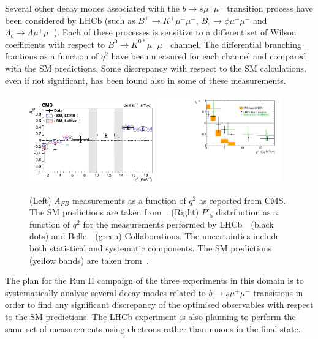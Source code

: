 Several other decay modes associated with the $b \to s \mu^+ \mu^-$ transition process have been considered by LHCb (such as $B^+ \to K^{+} \mu^+ \mu^-$, $B_s \to  \phi \mu^+ \mu^-$ and $\Lambda_b \to \Lambda \mu^+ \mu^-$). Each of these processes is sensitive to a different set of Wilson coefficients with respect to $B^0 \to  K^{0*} \mu^+ \mu^-$ channel. The differential branching fractions as a function of $q^2$ have been measured for each channel and compared with the SM predictions. Some discrepancy with respect to the SM calculations, even if not significant, has been found also in some of these measurements.
\begin{figure}[!t]
  \begin{center}
  \includegraphics[width=0.48\textwidth]{AFB_CMS.png}
  \includegraphics[width=0.48\textwidth]{P5p.pdf}
    \caption {(Left) $A_{FB}$ measurements as a function of $q^2$ as reported from CMS. The SM predictions are taken from~\cite{ABSZ,ABSZ2}. (Right) $P'_5$ distribution as a function of $q^2$ for the measurements performed by LHCb~\cite{mumuK_LHCb}~(black dots) and Belle~\cite{Belle}~(green) Collaborations. The uncertainties include both statistical and systematic components. The SM predictions (yellow bands) are taken from~\cite{DHMV}. }
        \label{fig:mumuK}
  \end{center}
\end{figure}

The plan for the Run II campaign of the three experiments in this domain is to systematically analyse several decay modes related to $b \to s \mu^+ \mu^-$  transitions in order to find any significant discrepancy of the optimised observables with respect to the SM predictions. The LHCb experiment is also planning to perform the same set of measurements using electrons rather than muons in the final state. 

